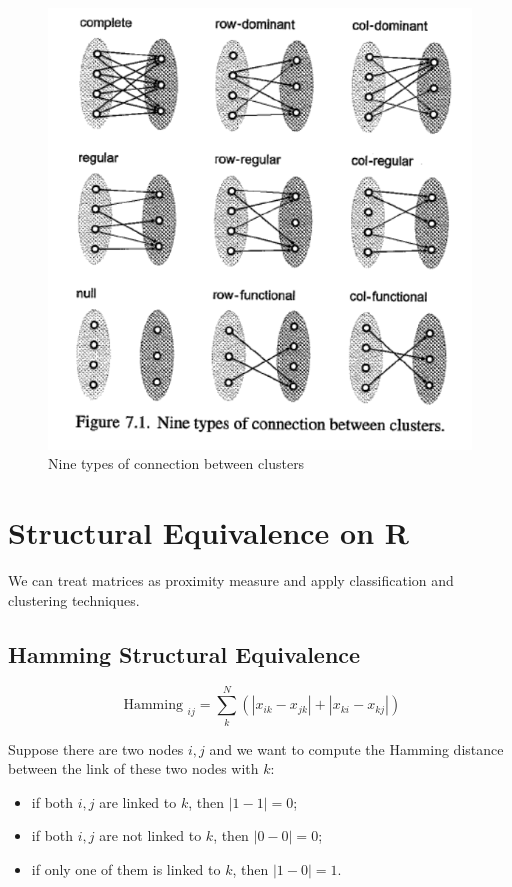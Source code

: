 \documentclass[
  notitlepage,
  onecolumn,
  openany]{book}
\providecommand{\tightlist}{%
  \setlength{\itemsep}{0pt}\setlength{\parskip}{0pt}}
\begin{document}
\begin{figure}[h!]

{\centering \includegraphics[width=0.5\linewidth]{images/11-Subgroups and Structural Equivalence/Untitled 5} 

}

\caption{Nine types of connection between clusters}\label{fig:unnamed-chunk-83}
\end{figure}

\hypertarget{structural-equivalence-on-r}{%
\section{Structural Equivalence on R}\label{structural-equivalence-on-r}}

We can treat matrices as proximity measure and apply classification and clustering techniques.

\hypertarget{hamming-structural-equivalence}{%
\subsection{Hamming Structural Equivalence}\label{hamming-structural-equivalence}}

\[
\text { Hamming }_{i j}=\sum_{k}^{N}\left(\left|x_{i k}-x_{j k}\right|+\left|x_{k i}-x_{k j}\right|\right)
\]

Suppose there are two nodes \(i,j\) and we want to compute the Hamming distance between the link of these two nodes with \(k\):

\begin{itemize}
\tightlist
\item
  if both \(i,j\) are linked to \(k\), then \(|1-1| = 0\);
\item
  if both \(i,j\) are not linked to \(k\), then \(|0-0| = 0\);
\item
  if only one of them is linked to \(k\), then \(|1-0| = 1\).
\end{itemize}
\end{document}
